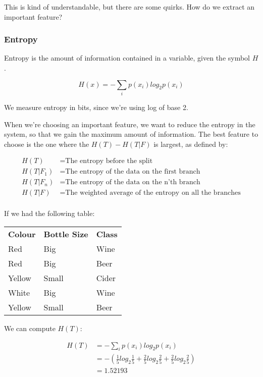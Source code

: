 This is kind of understandable, but there are some quirks. How do we extract an
important feature?

\subsubsection{Entropy}

Entropy is the amount of information contained in a variable, given the symbol
$H$.

\[
  H(x) = -\sum\limits_ip(x_i)log_2p(x_i)
\] 

We measure entropy in bits, since we're using log of base 2.

When we're choosing an important feature, we want to reduce the entropy in the
system, so that we gain the maximum amount of information. The best feature to
choose is the one where the $H(T) - H(T | F)$ is largest, as defined by:


\begin{align*}
  H(T) &= \text{The entropy before the split}\\
  H(T | F_1) &= \text{The entropy of the data on the first branch}\\
  H(T | F_n) &= \text{The entropy of the data on the n'th branch}\\
  H(T | F) &= \text{The weighted average of the entropy on all the branches}\\
\end{align*}

If we had the following table:

\begin{table}[H]
  \centering
  \begin{tabular}{l l l}
    \textbf{Colour} & \textbf{Bottle Size} & \textbf{Class}\\
    Red     & Big   & Wine\\
    Red     & Big   & Beer\\
    Yellow  & Small & Cider\\
    White   & Big   & Wine\\
    Yellow  & Small & Beer\\
  \end{tabular}
\end{table}

We can compute $H(T)$:

\begin{align*}
  H(T) &= -\sum\limits_ip(x_i)log_2p(x_i)\\
       &= -(\frac{1}{5}log_2\frac{1}{5} + \frac{2}{5}log_2\frac{2}{5} + \frac{2}{5}log_2\frac{2}{5})\\
       &= 1.52193
\end{align*}


